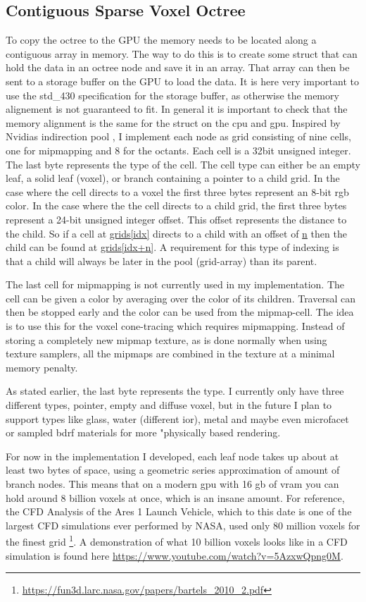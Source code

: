 \subsection*{Contiguous Sparse Voxel Octree}
To copy the octree to the GPU the memory needs to be located along a contiguous array in memory. The way to do this is to create some struct that can hold the data in an octree node and save it in an array. That array can then be sent to a storage buffer on the GPU to load the data. It is here very important to use the std\_430 specification for the storage buffer, as otherwise the memory alignement is not guaranteed to fit. In general it is important to check that the memory alignment is the same for the struct on the cpu and gpu. Inspired by Nvidias indirection pool \cite{10.5555/1062395}, I implement each node as grid consisting of nine cells, one for mipmapping and 8 for the octants. Each cell is a 32bit unsigned integer. The last byte represents the type of the cell. The cell type can either be an empty leaf, a solid leaf (voxel), or branch containing a pointer to a child grid. In the case where the cell directs to a voxel the first three bytes represent an 8-bit rgb color. In the case where the the cell directs to a child grid, the first three bytes represent a 24-bit unsigned integer offset. This offset represents the distance to the child. So if a cell at \url{grids[idx]} directs to a child with an offset of \url{n} then the child can be found at \url{grids[idx+n]}. A requirement for this type of indexing is that a child will always be later in the pool (grid-array) than its parent.

The last cell for mipmapping is not currently used in my implementation. The cell can be given a color by averaging over the color of its children. Traversal can then be stopped early and the color can be used from the mipmap-cell. The idea is to use this for the voxel cone-tracing which requires mipmapping. Instead of storing a completely new mipmap texture, as is done normally when using texture samplers, all the mipmaps are combined in the texture at a minimal memory penalty. 

As stated earlier, the last byte represents the type. I currently only have three different types, pointer, empty and diffuse voxel, but in the future I plan to support types like glass, water (different ior), metal and maybe even microfacet or sampled bdrf materials for more "physically based rendering.

For now in the implementation I developed, each leaf node takes up about at least two bytes of space, using a geometric series approximation of amount of branch nodes. This means that on a modern gpu with 16 gb of vram you can hold around 8 billion voxels at once, which is an insane amount. For reference, the CFD Analysis of the Ares 1 Launch Vehicle, which to this date is one of the largest CFD simulations ever performed by NASA, used only 80 million voxels for the finest grid \footnote{\url{https://fun3d.larc.nasa.gov/papers/bartels_2010_2.pdf}}. A demonstration of what 10 billion voxels looks like in a CFD simulation is found here \url{https://www.youtube.com/watch?v=5AzxwQpng0M}.

